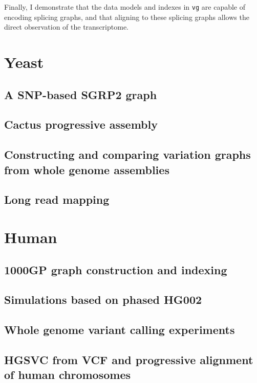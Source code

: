Finally, I demonstrate that the data models and indexes in {\tt vg} are capable of encoding splicing graphs, and that aligning to these splicing graphs allows the direct observation of the transcriptome.

\section{Yeast}

\subsection{A SNP-based SGRP2 graph}

\subsection{Cactus progressive assembly}

\subsection{Constructing and comparing variation graphs from whole genome assemblies}

\subsection{Long read mapping} %

\section{Human}

\subsection{1000GP graph construction and indexing}

\subsection{Simulations based on phased HG002}
\label{sec:1000GP_sim}

\subsection{Whole genome variant calling experiments}

\subsection{HGSVC from VCF and progressive alignment of human chromosomes}

